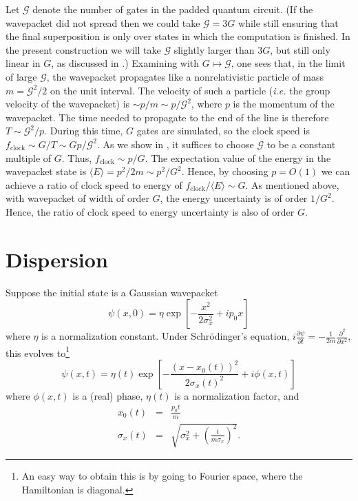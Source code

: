 \documentclass[11pt]{article}
\begin{document}
Let $\mathcal{G}$ denote the number of gates in the padded quantum circuit. (If the wavepacket did not spread then we could take $\mathcal{G} = 3G$ while still ensuring that the final superposition is only over states in which the computation is finished. In the present construction we will take $\mathcal{G}$ slightly larger than $3G$, but still only linear in $G$, as discussed in .) Examining  with $G \mapsto \mathcal{G}$, one sees that, in the limit of large $\mathcal{G}$, the wavepacket propagates like a nonrelativistic particle of mass $m = \mathcal{G}^2/2$ on the unit interval. The velocity of such a particle (\emph{i.e.} the group velocity of the wavepacket) is $\sim p/m \sim p/\mathcal{G}^2$, where $p$ is the momentum of the wavepacket. The time needed to propagate to the end of the line is therefore $T \sim \mathcal{G}^2/p$. During this time, $G$ gates are simulated, so the clock speed is $f_{\mathrm{clock}} \sim G/T \sim Gp/\mathcal{G}^2$. As we show in , it suffices to choose $\mathcal{G}$ to be a constant multiple of $G$. Thus, $f_{\mathrm{clock}} \sim p/G$. The expectation value of the energy in the wavepacket state is $\langle E \rangle = p^2/2m \sim p^2/G^2$. Hence, by choosing $p = O(1)$ we can achieve a ratio of clock speed to energy of $f_{\mathrm{clock}}/\langle E \rangle \sim G$. As mentioned above, with wavepacket of width of order $G$, the energy uncertainty is of order $1/G^2$. Hence, the ratio of clock speed to energy uncertainty is also of order $G$. 

\section{Dispersion}
\label{sec:dispersion}

Suppose the initial state is a Gaussian wavepacket
\begin{equation}
\psi(x,0) = \eta \exp \left[ - \frac{x^2}{2 \sigma_x^2} + i p_0 x \right]
\end{equation}
where $\eta$ is a normalization constant. Under Schr{\"o}dinger's equation, $i \frac{\partial \psi}{\partial t} = -\frac{1}{2m} \frac{\partial^2}{\partial x^2}$, this evolves to\footnote{An easy way to obtain this is by going to Fourier space, where the Hamiltonian is diagonal.}
\begin{equation}
\psi(x,t) = \eta(t) \exp \left[ - \frac{(x - x_0(t))^2}{2 \sigma_x(t)^2} + i \phi(x,t) \right]
\end{equation}
where $\phi(x,t)$ is a (real) phase, $\eta(t)$ is a normalization factor, and
\begin{eqnarray}
x_0(t) & = & \frac{p_0 t}{m} \\
\sigma_x(t) & = & \sqrt{ \sigma_x^2 + \left( \frac{t}{m \sigma_x} \right)^2}.
\label{breadth}
\end{eqnarray}
\end{document}
